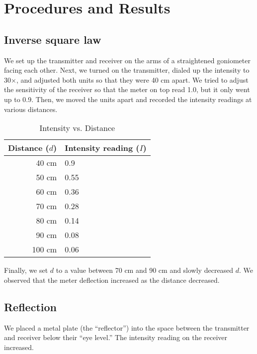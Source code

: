 \documentclass[11pt, titlepage, letterpaper, twoside]{article}
\begin{document}
\section{Procedures and Results}

\subsection{Inverse square law}

We set up the transmitter and receiver on the arms of a straightened goniometer facing each other. Next, we turned
on the transmitter, dialed up the intensity to 30$\times$, and adjusted both units so that they were 40 cm apart.
We tried to adjust the sensitivity of the receiver so that the meter on top read 1.0, but it only went up
to 0.9. Then, we moved the units apart and recorded the intensity readings at various distances.

\begin{table}[h!]
\centering
\caption{Intensity vs. Distance}
\label{Ixr}
\begin{tabular}{|r|l|}
\hline
Distance ($d$) & Intensity reading ($I$) \\ \hline
40 cm          & 0.9                     \\ \hline
50 cm          & 0.55                    \\ \hline
60 cm          & 0.36                    \\ \hline
70 cm          & 0.28                    \\ \hline
80 cm          & 0.14                    \\ \hline
90 cm          & 0.08                    \\ \hline
100 cm         & 0.06                    \\ \hline
\end{tabular}
\end{table}

\pagebreak

Finally, we set $d$ to a value between 70 cm and 90 cm and slowly decreased $d$. We observed that the meter
deflection increased as the distance decreased.

\subsection{Reflection}

We placed a metal plate (the ``reflector'') into the space between the transmitter and receiver below their ``eye level.''
The intensity reading on the receiver increased.
\end{document}
